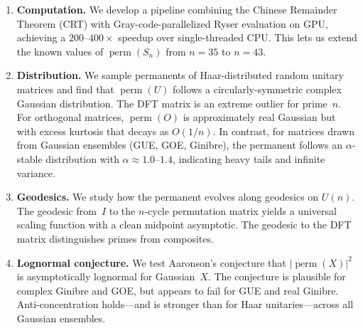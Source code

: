 \documentclass[11pt]{amsart}
\theoremstyle{definition}
\theoremstyle{remark}
\DeclareMathOperator{\perm}{perm}
\begin{document}
\begin{enumerate}[leftmargin=2em]
\item \textbf{Computation.} We develop a pipeline combining the
  Chinese Remainder Theorem (CRT) with Gray-code-parallelized Ryser
  evaluation on GPU, achieving a $200$--$400\times$ speedup over
  single-threaded CPU.  This lets us extend the known values of
  $\perm(S_n)$ from $n=35$ to $n=43$.

\item \textbf{Distribution.}  We sample permanents of Haar-distributed
  random unitary matrices and find that $\perm(U)$ follows a
  circularly-symmetric complex Gaussian distribution.  The DFT matrix
  is an extreme outlier for prime~$n$.  For orthogonal matrices,
  $\perm(O)$ is approximately real Gaussian but with excess kurtosis
  that decays as $O(1/n)$.  In contrast, for matrices drawn from
  Gaussian ensembles (GUE, GOE, Ginibre), the permanent follows an
  $\alpha$-stable distribution with $\alpha\approx 1.0$--$1.4$,
  indicating heavy tails and infinite variance.

\item \textbf{Geodesics.}  We study how the permanent evolves along
  geodesics on $U(n)$.  The geodesic from~$I$ to the $n$-cycle
  permutation matrix yields a universal scaling function with a clean
  midpoint asymptotic.  The geodesic to the DFT matrix distinguishes
  primes from composites.

\item \textbf{Lognormal conjecture.}  We test Aaronson's conjecture
  that $|\perm(X)|^2$ is asymptotically lognormal for Gaussian~$X$.
  The conjecture is plausible for complex Ginibre and GOE, but appears
  to fail for GUE and real Ginibre.  Anti-concentration holds---and is
  stronger than for Haar unitaries---across all Gaussian ensembles.
\end{enumerate}
\end{document}
